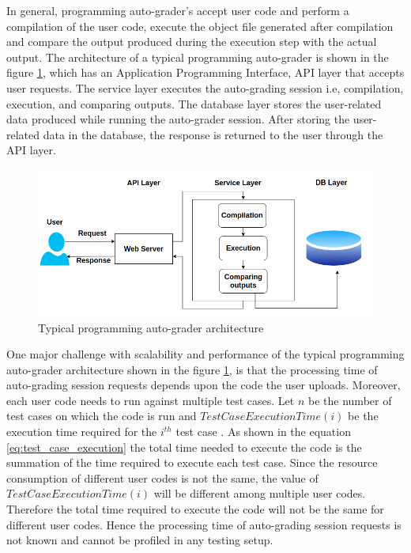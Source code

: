 \documentclass{iitbreport}
\begin{document}
In general, programming auto-grader’s accept user code and perform a compilation of the user code, execute the object file generated after compilation and compare the output produced during the execution step with the actual output. The architecture of a typical programming auto-grader is shown in the figure \ref{typical_auto_grader}, which has an Application Programming Interface, API layer that accepts user requests. The service layer executes the auto-grading session i.e, compilation, execution, and comparing outputs. The database layer stores the user-related data produced while running the auto-grader session. After storing the user-related data in the database, the response is returned to the user through the API layer.
\begin{figure}[h]
  \centering
  \includegraphics[width=\linewidth]{Images/typical_autograder.png}
  \caption{Typical programming auto-grader architecture}
  \label{typical_auto_grader}
\end{figure}


One major challenge with scalability and performance of the typical programming auto-grader architecture shown in the figure \ref{typical_auto_grader}, is that the processing time of auto-grading session requests depends upon the code the user uploads. Moreover, each user code needs to run against multiple test cases. Let $n$ be the number of test cases on which the code is run and $Test Case Execution Time(i)$ be the execution time required for the $i^{th}$ test case . As shown in the equation \ref{eq:test_case_execution} the total time needed to execute the code is the summation of the time required to execute each test case. Since the resource consumption of different user codes is not the same, the value of $Test Case Execution Time(i)$  will be different among multiple user codes. Therefore the total time required to execute the code will not be the same for different user codes. Hence the processing time of auto-grading session requests is not known and cannot be profiled in any testing setup.
\end{document}

